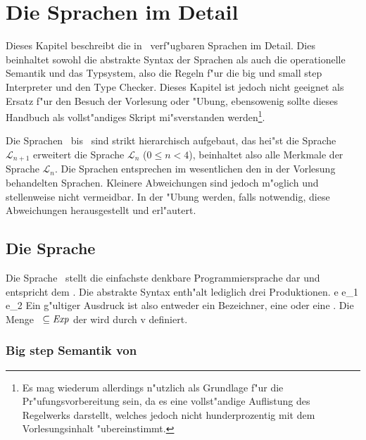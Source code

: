
\chapter{Die Sprachen im Detail\label{DieSprachenImDetail}}

Dieses Kapitel beschreibt die in \TPML\ verf"ugbaren Sprachen im Detail. Dies beinhaltet sowohl die abstrakte Syntax der Sprachen als auch die
operationelle Semantik und das Typsystem, also die Regeln f"ur die big und small step Interpreter und den Type Checker. Dieses Kapitel ist
jedoch nicht geeignet als Ersatz f"ur den Besuch der Vorlesung oder "Ubung, ebensowenig sollte dieses Handbuch als vollst"andiges Skript
mi"sverstanden werden\footnote{Es mag wiederum allerdings n"utzlich als Grundlage f"ur die Pr"ufungsvorbereitung sein, da es eine vollst"andige
Auflistung des Regelwerks darstellt, welches jedoch nicht hunderprozentig mit dem Vorlesungsinhalt "ubereinstimmt.}.

Die Sprachen \LZERO\ bis \LFOUR\ sind strikt hierarchisch aufgebaut, das hei"st die Sprache $\mathcal{L}_{n+1}$ erweitert die Sprache
$\mathcal{L}_n$ ($0 \le n < 4$), beinhaltet also alle Merkmale der Sprache $\mathcal{L}_n$. Die Sprachen entsprechen im wesentlichen
den in der Vorlesung behandelten Sprachen. Kleinere Abweichungen sind jedoch m"oglich und stellenweise nicht vermeidbar. In der "Ubung
werden, falls notwendig, diese Abweichungen herausgestellt und erl"autert.



\section{Die Sprache \LZERO}

Die Sprache \LZERO\ stellt die einfachste denkbare Programmiersprache dar und entspricht dem  . Die abstrakte Syntax enth"alt lediglich drei Produktionen.
\bgram
e \is \id
  \al {}
  \al e_1\,e_2
\egram
Ein g"ultiger Ausdruck ist also entweder ein Bezeichner, eine  oder eine .
Die Menge \notation{$\Val$}\ $\subseteq {\text{\it Exp\/}}$ der    wird durch
\bgram
v \is \id
  \al {}
\egram
definiert.


\subsection{Big step Semantik von \LZERO}

